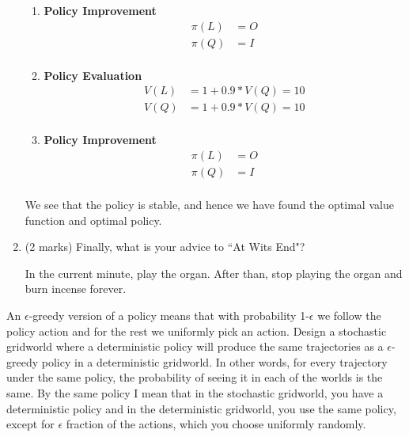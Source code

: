 \documentclass[addpoints,12pt,solution]{exam}
\begin{document}
\begin{questions}
\begin{enumerate}[label=(\alph*)]
\begin{solution}
\begin{enumerate}
                    \item \textbf{Policy Improvement}
                    \begin{align*}
                        \pi(L) &= O \\
                        \pi(Q) &= I \\
                    \end{align*}

                    \item \textbf{Policy Evaluation}
                    \begin{align*}
                        V(L) &= 1 + 0.9 * V(Q) = 10 \\
                        V(Q) &= 1 + 0.9 * V(Q) = 10 \\
                    \end{align*}


                    \item \textbf{Policy Improvement}
                    \begin{align*}
                        \pi(L) &= O \\
                        \pi(Q) &= I \\
                    \end{align*}

                \end{enumerate}
                We see that the policy is stable, and hence we have found the optimal value function and optimal policy.

            \end{solution}

            \item (2 marks) Finally, what is your advice to ``At Wits End"?

            \begin{solution}
                In the current minute, play the organ.
                After than, stop playing the organ and burn incense forever.
            \end{solution}


        \end{enumerate}

         An $\epsilon$-greedy version of a policy means that with probability 1-$\epsilon$ we follow the policy action and for the rest we uniformly pick an action.
        Design a stochastic gridworld where a deterministic policy will produce
        the same trajectories as a $\epsilon$-greedy policy in a deterministic
        gridworld. In other words, for every trajectory under the same policy, the
        probability of seeing it in each of the worlds is the same. By the same policy I mean that in the stochastic gridworld, you have a deterministic policy and in the
        deterministic gridworld, you use the same policy, except for $\epsilon$ fraction of the actions, which you choose uniformly randomly.


\end{questions}
\end{document}
